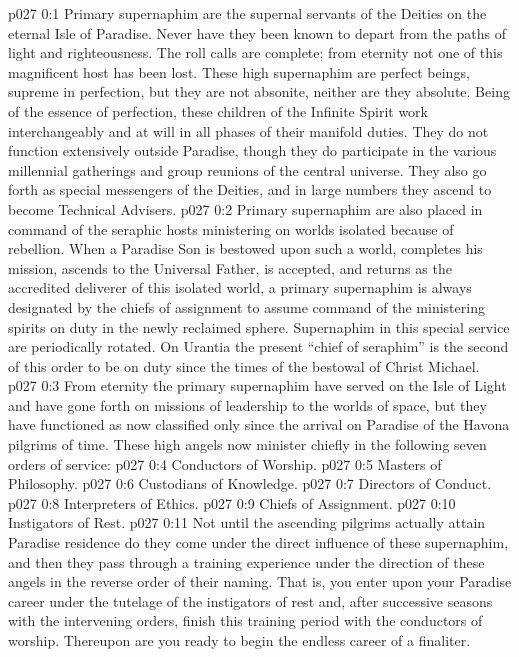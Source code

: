 \author{Perfector of Wisdom}
\vs p027 0:1 Primary supernaphim are the supernal servants of the Deities on the eternal Isle of Paradise. Never have they been known to depart from the paths of light and righteousness. The roll calls are complete; from eternity not one of this magnificent host has been lost. These high supernaphim are perfect beings, supreme in perfection, but they are not absonite, neither are they absolute. Being of the essence of perfection, these children of the Infinite Spirit work interchangeably and at will in all phases of their manifold duties. They do not function extensively outside Paradise, though they do participate in the various millennial gatherings and group reunions of the central universe. They also go forth as special messengers of the Deities, and in large numbers they ascend to become Technical Advisers.
\vs p027 0:2 Primary supernaphim are also placed in command of the seraphic hosts ministering on worlds isolated because of rebellion. When a Paradise Son is bestowed upon such a world, completes his mission, ascends to the Universal Father, is accepted, and returns as the accredited deliverer of this isolated world, a primary supernaphim is always designated by the chiefs of assignment to assume command of the ministering spirits on duty in the newly reclaimed sphere. Supernaphim in this special service are periodically rotated. On Urantia the present “chief of seraphim” is the second of this order to be on duty since the times of the bestowal of Christ Michael.
\vs p027 0:3 From eternity the primary supernaphim have served on the Isle of Light and have gone forth on missions of leadership to the worlds of space, but they have functioned as now classified only since the arrival on Paradise of the Havona pilgrims of time. These high angels now minister chiefly in the following seven orders of service:
\pc \vs p027 0:4 \bibnobreakspace Conductors of Worship.
\vs p027 0:5 \bibnobreakspace Masters of Philosophy.
\vs p027 0:6 \bibnobreakspace Custodians of Knowledge.
\vs p027 0:7 \bibnobreakspace Directors of Conduct.
\vs p027 0:8 \bibnobreakspace Interpreters of Ethics.
\vs p027 0:9 \bibnobreakspace Chiefs of Assignment.
\vs p027 0:10 \bibnobreakspace Instigators of Rest.
\vs p027 0:11 Not until the ascending pilgrims actually attain Paradise residence do they come under the direct influence of these supernaphim, and then they pass through a training experience under the direction of these angels in the reverse order of their naming. That is, you enter upon your Paradise career under the tutelage of the instigators of rest and, after successive seasons with the intervening orders, finish this training period with the conductors of worship. Thereupon are you ready to begin the endless career of a finaliter.
